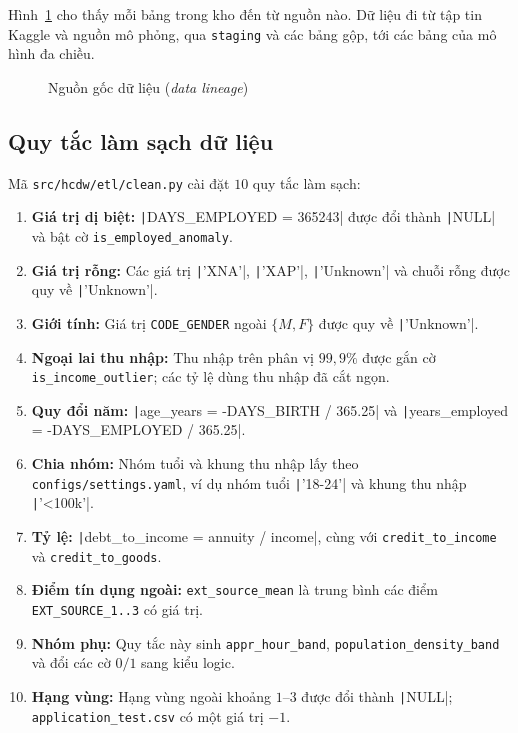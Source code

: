 Hình~\ref{fig:data_lineage} cho thấy mỗi bảng trong kho đến từ nguồn nào. Dữ liệu đi từ tập tin Kaggle và nguồn mô phỏng, qua \texttt{staging} và các bảng gộp, tới các bảng của mô hình đa chiều.

\begin{figure}[H]
	\centering
	\caption{Nguồn gốc dữ liệu (\textit{data lineage})}
	\label{fig:data_lineage}
\end{figure}

\subsection{Quy tắc làm sạch dữ liệu}
Mã \texttt{src/hcdw/etl/clean.py} cài đặt $10$ quy tắc làm sạch:
\begin{enumerate}[label=\textit{R\arabic*}, topsep=0pt, itemsep=1pt, leftmargin=*]
	\item \textbf{Giá trị dị biệt:} \texttt|DAYS_EMPLOYED = 365243| được đổi thành \texttt|NULL| và bật cờ \texttt{is\_employed\_anomaly}.
	\item \textbf{Giá trị rỗng:} Các giá trị \texttt|'XNA'|, \texttt|'XAP'|, \texttt|'Unknown'| và chuỗi rỗng được quy về \texttt|'Unknown'|.
	\item \textbf{Giới tính:} Giá trị \texttt{CODE\_GENDER} ngoài $\{M, F\}$ được quy về \texttt|'Unknown'|.
	\item \textbf{Ngoại lai thu nhập:} Thu nhập trên phân vị $99{,}9\%$ được gắn cờ \texttt{is\_income\_outlier}; các tỷ lệ dùng thu nhập đã cắt ngọn.
	\item \textbf{Quy đổi năm:} \texttt|age_years = -DAYS_BIRTH / 365.25| và \texttt|years_employed = -DAYS_EMPLOYED / 365.25|.
	\item \textbf{Chia nhóm:} Nhóm tuổi và khung thu nhập lấy theo \texttt{configs/settings.yaml}, ví dụ nhóm tuổi \texttt|'18-24'| và khung thu nhập \texttt|'<100k'|.
	\item \textbf{Tỷ lệ:} \texttt|debt_to_income = annuity / income|, cùng với \texttt{credit\_to\_income} và \texttt{credit\_to\_goods}.
	\item \textbf{Điểm tín dụng ngoài:} \texttt{ext\_source\_mean} là trung bình các điểm \texttt{EXT\_SOURCE\_1..3} có giá trị.
	\item \textbf{Nhóm phụ:} Quy tắc này sinh \texttt{appr\_hour\_band}, \texttt{population\_density\_band} và đổi các cờ $0/1$ sang kiểu logic.
	\item \textbf{Hạng vùng:} Hạng vùng ngoài khoảng $1$--$3$ được đổi thành \texttt|NULL|; \texttt{application\_test.csv} có một giá trị $-1$.
\end{enumerate}

